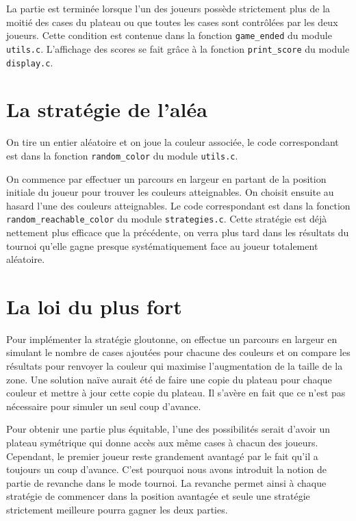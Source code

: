 \documentclass[12pt,S,fira-sans]{paper}
\begin{document}
\begin{qu}
    La partie est terminée lorsque l'un des joueurs possède strictement plus de la moitié des cases du plateau ou que toutes les cases sont contrôlées par les deux joueurs.
    Cette condition est contenue dans la fonction \verb|game_ended| du module \verb|utils.c|. L'affichage des scores se fait grâce à la fonction \verb|print_score| du module \verb|display.c|.
\end{qu}

\section{La stratégie de l'aléa}

\begin{qu}
    On tire un entier aléatoire et on joue la couleur associée, le code correspondant est dans la fonction \verb|random_color| du module \verb|utils.c|.
\end{qu}

\begin{qu}
    On commence par effectuer un parcours en largeur en partant de la position initiale du joueur pour trouver les couleurs atteignables. On choisit ensuite au hasard l'une des couleurs atteignables. Le code correspondant est dans la fonction \verb|random_reachable_color| du module \verb|strategies.c|.
    Cette stratégie est déjà nettement plus efficace que la précédente, on verra plus tard dans les résultats du tournoi qu'elle gagne presque systématiquement face au joueur totalement aléatoire.
\end{qu}

\section{La loi du plus fort}

\begin{qu}
    Pour implémenter la stratégie gloutonne, on effectue un parcours en largeur en simulant le nombre de cases ajoutées pour chacune des couleurs et on compare les résultats pour renvoyer la couleur qui maximise l'augmentation de la taille de la zone.
    Une solution naïve aurait été de faire une copie du plateau pour chaque couleur et mettre à jour cette copie du plateau. Il s'avère en fait que ce n'est pas nécessaire pour simuler un seul coup d'avance.
\end{qu}

\begin{qu}
    Pour obtenir une partie plus équitable, l'une des possibilités serait d'avoir un plateau symétrique qui donne accès aux même cases à chacun des joueurs. Cependant, le premier joueur reste grandement avantagé par le fait qu'il a toujours un coup d'avance. C'est pourquoi nous avons introduit la notion de partie de revanche dans le mode tournoi. La revanche permet ainsi à chaque stratégie de commencer dans la position avantagée et seule une stratégie strictement meilleure pourra gagner les deux parties.
\end{qu}
\end{document}
